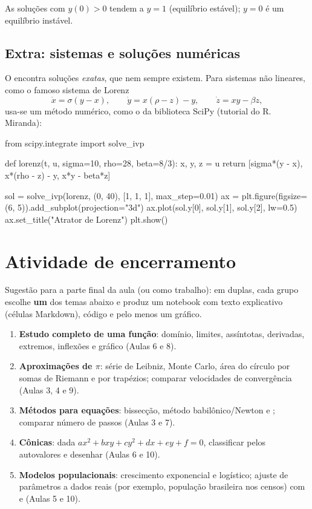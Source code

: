 As soluções com $y(0)>0$ tendem a $y=1$ (equilíbrio estável); $y=0$ é um equilíbrio instável.

\subsection{Extra: sistemas e soluções numéricas}

O  encontra soluções \emph{exatas}, que nem sempre existem. Para sistemas não lineares, como o famoso
sistema de Lorenz
\[
\dot x=\sigma(y-x),\qquad \dot y=x(\rho-z)-y,\qquad \dot z=xy-\beta z,
\]
usa-se um método numérico, como o  da biblioteca SciPy (tutorial do R. Miranda):

\begin{entrada}
from scipy.integrate import solve_ivp

def lorenz(t, u, sigma=10, rho=28, beta=8/3):
    x, y, z = u
    return [sigma*(y - x), x*(rho - z) - y, x*y - beta*z]

sol = solve_ivp(lorenz, (0, 40), [1, 1, 1], max_step=0.01)
ax = plt.figure(figsize=(6, 5)).add_subplot(projection="3d")
ax.plot(sol.y[0], sol.y[1], sol.y[2], lw=0.5)
ax.set_title("Atrator de Lorenz")
plt.show()
\end{entrada}

\section{Atividade de encerramento}

Sugestão para a parte final da aula (ou como trabalho): em duplas, cada grupo escolhe \textbf{um} dos temas abaixo e
produz um notebook com texto explicativo (células Markdown), código e pelo menos um gráfico.

\begin{enumerate}
  \item \textbf{Estudo completo de uma função}: domínio, limites, assíntotas, derivadas, extremos, inflexões e
  gráfico (Aulas 6 e 8).
  \item \textbf{Aproximações de $\pi$}: série de Leibniz, Monte Carlo, área do círculo por somas de Riemann e por
  trapézios; comparar velocidades de convergência (Aulas 3, 4 e 9).
  \item \textbf{Métodos para equações}: bissecção, método babilônico/Newton e ; comparar número de
  passos (Aulas 3 e 7).
  \item \textbf{Cônicas}: dada $ax^2+bxy+cy^2+dx+ey+f=0$, classificar pelos autovalores e desenhar (Aulas 6 e 10).
  \item \textbf{Modelos populacionais}: crescimento exponencial e logístico; ajuste de parâmetros a dados reais
  (por exemplo, população brasileira nos censos) com  e  (Aulas 5 e 10).
\end{enumerate}

